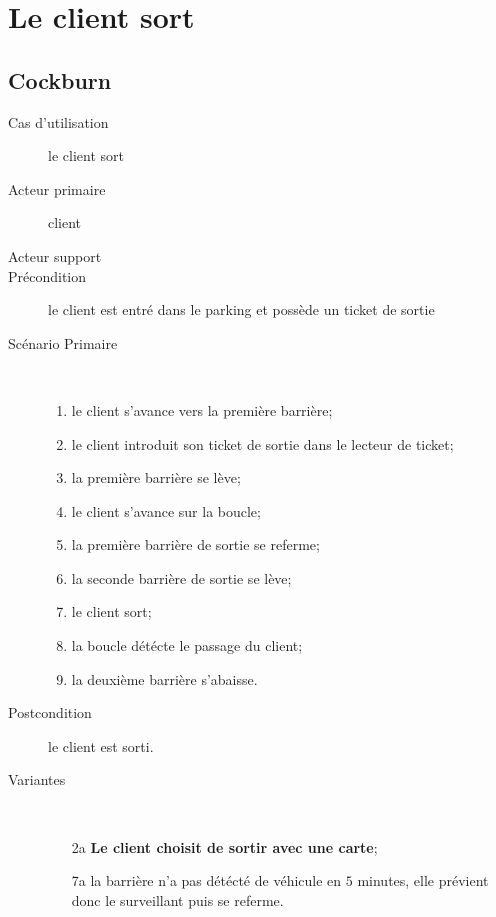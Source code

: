 \documentclass[a4paper]{article}
\begin{document}
\newpage

\section{Le client sort}
\subsection{Cockburn}
\begin{description}
	\item[Cas d'utilisation] le client sort
	\item[Acteur primaire] client
	\item[Acteur support]
	\item[Pr\'econdition] le client est entr\'e dans le parking et poss\`ede un ticket de sortie
	\item[Sc\'enario Primaire] \
	\begin{enumerate}
		\item le client s'avance vers la premi\`ere barri\`ere;
		\item le client introduit son ticket de sortie dans le lecteur de ticket;
		\item la premi\`ere barri\`ere se l\`eve;
		\item le client s'avance sur la boucle;
		\item la premi\`ere barri\`ere de sortie se referme;
		\item la seconde barri\`ere de sortie se l\`eve;
		\item le client sort;
		\item la boucle d\'et\'ecte le passage du client;
		\item la deuxi\`eme barri\`ere s'abaisse.
	\end{enumerate}
	\item[Postcondition] le client est sorti.
	\item[Variantes] \
	\begin{enumerate}
		\item[2a] \textbf{Le client choisit de sortir avec une carte};
		\item[7a] la barri\`ere n'a pas d\'et\'ect\'e de v\'ehicule en $5$ minutes,
			elle pr\'evient donc le surveillant puis se referme.
	\end{enumerate}
\end{description}

\newpage
\end{document}
